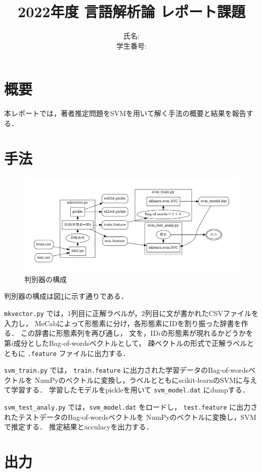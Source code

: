 \documentclass[a4paper, lualatex, ja=standard]{bxjsarticle}
\title{2022年度 言語解析論 レポート課題}
\author{氏名:  \\ 学生番号: }
\begin{document}
\maketitle

\section{概要}

本レポートでは，著者推定問題をSVMを用いて解く手法の概要と結果を報告する．

\section{手法}

\begin{figure}[bt]
  \centering
  \includegraphics[width=16cm]{process.pdf}
  \caption{判別器の構成} \label{fig:process}
\end{figure}

判別器の構成は図\ref{fig:process}に示す通りである．

\verb|mkvector.py| では，1列目に正解ラベルが，2列目に文が書かれたCSVファイルを入力し，
MeCabによって形態素に分け，各形態素にIDを割り振った辞書を作る．
この辞書に形態素列を再び通し，
文を，ID$i$の形態素が現れるかどうかを第$i$成分としたBag-of-wordsベクトルとして，
疎ベクトルの形式で正解ラベルとともに \verb|.feature| ファイルに出力する．

\verb|svm_train.py| では，
\verb|train.feature| に出力された学習データのBag-of-wordsベクトルを
NumPyのベクトルに変換し，ラベルとともにscikit-learnのSVMに与えて学習する．
学習したモデルをpickleを用いて \verb|svm_model.dat| にdumpする．

\verb|svm_test_analy.py| では，\verb|svm_model.dat| をロードし，
\verb|test.feature| に出力されたテストデータのBag-of-wordsベクトルを
NumPyのベクトルに変換し，SVMで推定する．
推定結果とacculacyを出力する．

\section{出力}
\end{document}
